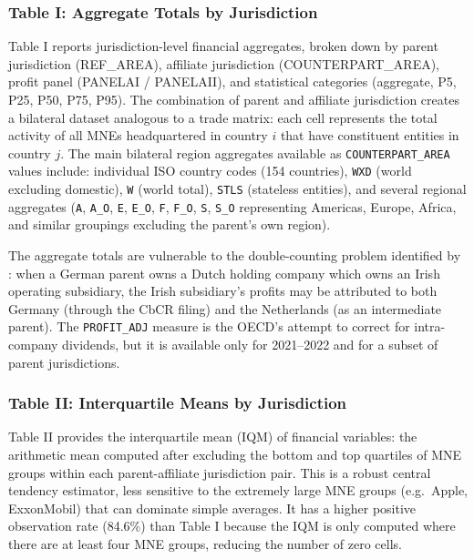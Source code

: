\documentclass[11pt,a4paper]{article}
\newcommand{\code}[1]{\texttt{#1}}
\begin{document}
\subsubsection{Table I: Aggregate Totals by Jurisdiction}\label{sec:table1}
Table I reports jurisdiction-level financial aggregates, broken down by parent jurisdiction (REF\_AREA), affiliate jurisdiction (COUNTERPART\_AREA), profit panel (PANELAI / PANELAII), and statistical categories (aggregate, P5, P25, P50, P75, P95). The combination of parent and affiliate jurisdiction creates a bilateral dataset analogous to a trade matrix: each cell represents the total activity of all MNEs headquartered in country $i$ that have constituent entities in country $j$. The main bilateral region aggregates available as \code{COUNTERPART\_AREA} values include: individual ISO country codes (154 countries), \code{WXD} (world excluding domestic), \code{W} (world total), \code{STLS} (stateless entities), and several regional aggregates (\code{A}, \code{A\_O}, \code{E}, \code{E\_O}, \code{F}, \code{F\_O}, \code{S}, \code{S\_O} representing Americas, Europe, Africa, and similar groupings excluding the parent's own region).

The aggregate totals are vulnerable to the double-counting problem identified by \citet{blouin2023}: when a German parent owns a Dutch holding company which owns an Irish operating subsidiary, the Irish subsidiary's profits may be attributed to both Germany (through the CbCR filing) and the Netherlands (as an intermediate parent). The \code{PROFIT\_ADJ} measure is the OECD's attempt to correct for intra-company dividends, but it is available only for 2021--2022 and for a subset of parent jurisdictions.

\subsubsection{Table II: Interquartile Means by Jurisdiction}\label{sec:table2}
Table II provides the interquartile mean (IQM) of financial variables: the arithmetic mean computed after excluding the bottom and top quartiles of MNE groups within each parent-affiliate jurisdiction pair. This is a robust central tendency estimator, less sensitive to the extremely large MNE groups (e.g.\ Apple, ExxonMobil) that can dominate simple averages. It has a higher positive observation rate (84.6\%) than Table I because the IQM is only computed where there are at least four MNE groups, reducing the number of zero cells.
\end{document}
